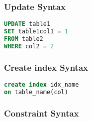 \subsubsection*{Update Syntax}
\begin{lstlisting}[language=SQL]
UPDATE table1 
SET table1col1 = 1 
FROM table2
WHERE col2 = 2
\end{lstlisting}

\subsubsection*{Create index Syntax}
\begin{lstlisting}[language=SQL]
create index idx_name
on table_name(col)
\end{lstlisting}

\subsubsection*{Constraint Syntax}

